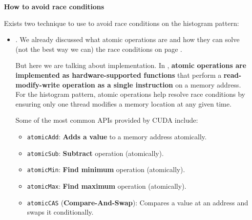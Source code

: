 \highspace
\begin{flushleft}
    \textcolor{Green3}{ \textbf{How to avoid race conditions}}
\end{flushleft}
Exists two technique to use to avoid race conditions on the histogram pattern:
\begin{itemize}
    \item {}. We already discussed what atomic operations are and how they can solve (not the best way we can) the race conditions on page \pageref{subsubsection: Avoid race conditions}.

    But here we are talking about implementation. In , \textbf{atomic operations are implemented as hardware-supported functions} that perform a \textbf{read-modify-write operation as a single instruction} on a memory address. For the histogram pattern, atomic operations help resolve race conditions by ensuring only one thread modifies a memory location at any given time.

    Some of the most common APIs provided by CUDA include:
    \begin{itemize}
        \item \texttt{atomicAdd}: \textbf{Adds a value} to a memory address atomically.
        \item \texttt{atomicSub}: \textbf{Subtract} operation (atomically).
        \item \texttt{atomicMin}: \textbf{Find minimum} operation (atomically).
        \item \texttt{atomicMax}: \textbf{Find maximum} operation (atomically).
        \item \texttt{atomicCAS} (\textbf{Compare-And-Swap}): Compares a value at an address and swaps it conditionally.
    \end{itemize}


\end{itemize}

